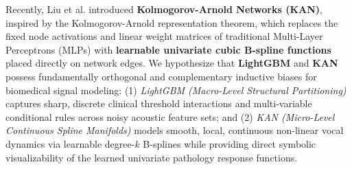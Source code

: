 \documentclass[journal,10pt,twoside]{IEEEtran}
\begin{document}
Recently, Liu et al. \cite{ref7} introduced \textbf{Kolmogorov-Arnold Networks (KAN)}, inspired by the Kolmogorov-Arnold representation theorem, which replaces the fixed node activations and linear weight matrices of traditional Multi-Layer Perceptrons (MLPs) with \textbf{learnable univariate cubic B-spline functions} placed directly on network edges. We hypothesize that \textbf{LightGBM} and \textbf{KAN} possess fundamentally orthogonal and complementary inductive biases for biomedical signal modeling: (1) \textit{LightGBM (Macro-Level Structural Partitioning)} captures sharp, discrete clinical threshold interactions and multi-variable conditional rules across noisy acoustic feature sets; and (2) \textit{KAN (Micro-Level Continuous Spline Manifolds)} models smooth, local, continuous non-linear vocal dynamics via learnable degree-$k$ B-splines while providing direct symbolic visualizability of the learned univariate pathology response functions.
\end{document}
